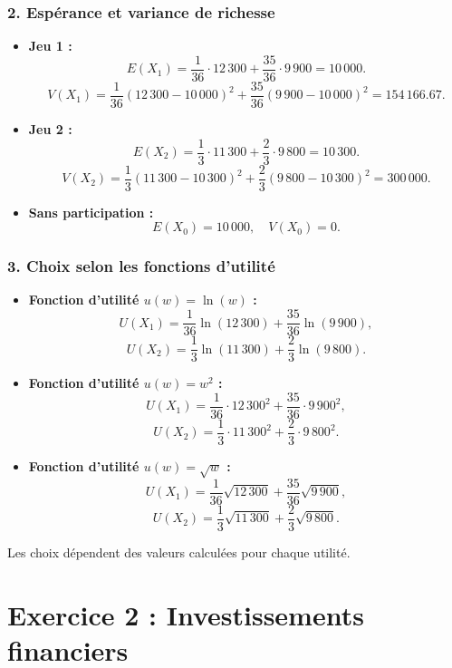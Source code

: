 \documentclass[12pt,a4paper]{article}
\begin{document}
	\subsubsection*{2. Espérance et variance de richesse}
	
	\begin{itemize}
		\item \textbf{Jeu 1 :}
		\[
		E(X_1) = \frac{1}{36} \cdot 12\,300 + \frac{35}{36} \cdot 9\,900 = 10\,000.
		\]
		\[
		V(X_1) = \frac{1}{36}(12\,300 - 10\,000)^2 + \frac{35}{36}(9\,900 - 10\,000)^2 = 154\,166.67.
		\]
		
		\item \textbf{Jeu 2 :}
		\[
		E(X_2) = \frac{1}{3} \cdot 11\,300 + \frac{2}{3} \cdot 9\,800 = 10\,300.
		\]
		\[
		V(X_2) = \frac{1}{3}(11\,300 - 10\,300)^2 + \frac{2}{3}(9\,800 - 10\,300)^2 = 300\,000.
		\]
		
		\item \textbf{Sans participation :}
		\[
		E(X_0) = 10\,000, \quad V(X_0) = 0.
		\]
	\end{itemize}
	
	\subsubsection*{3. Choix selon les fonctions d’utilité}
	
	\begin{itemize}
		\item \textbf{Fonction d’utilité \(u(w) = \ln(w)\) :}  
		\[
		U(X_1) = \frac{1}{36} \ln(12\,300) + \frac{35}{36} \ln(9\,900),
		\]
		\[
		U(X_2) = \frac{1}{3} \ln(11\,300) + \frac{2}{3} \ln(9\,800).
		\]
		
		\item \textbf{Fonction d’utilité \(u(w) = w^2\) :}
		\[
		U(X_1) = \frac{1}{36} \cdot 12\,300^2 + \frac{35}{36} \cdot 9\,900^2,
		\]
		\[
		U(X_2) = \frac{1}{3} \cdot 11\,300^2 + \frac{2}{3} \cdot 9\,800^2.
		\]
		
		\item \textbf{Fonction d’utilité \(u(w) = \sqrt{w}\) :}
		\[
		U(X_1) = \frac{1}{36} \sqrt{12\,300} + \frac{35}{36} \sqrt{9\,900},
		\]
		\[
		U(X_2) = \frac{1}{3} \sqrt{11\,300} + \frac{2}{3} \sqrt{9\,800}.
		\]
	\end{itemize}
	
	Les choix dépendent des valeurs calculées pour chaque utilité.
	
	\newpage
	
\section{Exercice 2 : Investissements financiers}
\end{document}

